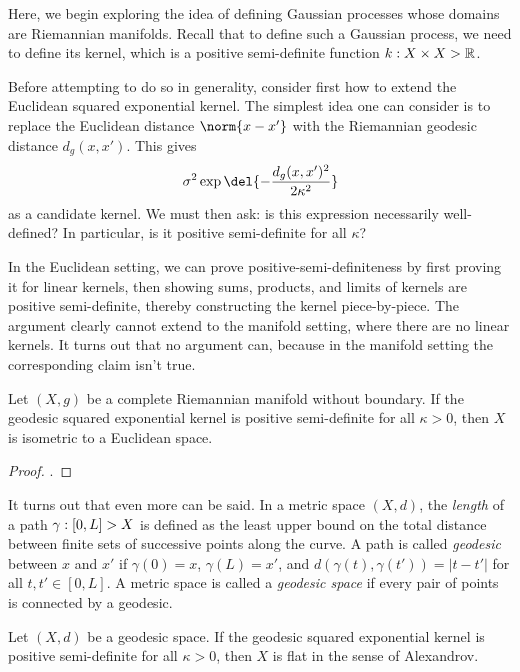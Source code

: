 \documentclass[11pt]{book}
\begin{document}
Here, we begin exploring the idea of defining Gaussian processes whose domains are Riemannian manifolds.
Recall that to define such a Gaussian process, we need to define its kernel, which is a positive semi-definite function $k : X \times X \-> \mathbb{R}$.

Before attempting to do so in generality, consider first how to extend the Euclidean squared exponential kernel.
The simplest idea one can consider is to replace the Euclidean distance $\norm{x-x'}$ with the Riemannian geodesic distance $d_g(x,x')$.
This gives 
\[
\sigma^2 \exp\del{-\frac{d_g(x,x')^2}{2\kappa^2}}
\]
as a candidate kernel.
We must then ask: is this expression necessarily well-defined? 
In particular, is it positive semi-definite for all $\kappa$?

In the Euclidean setting, we can prove positive-semi-definiteness by first proving it for linear kernels, then showing sums, products, and limits of kernels are positive semi-definite, thereby constructing the kernel piece-by-piece.
The argument clearly cannot extend to the manifold setting, where there are no linear kernels.
It turns out that no argument can, because in the manifold setting the corresponding claim isn't true.

\begin{result}
Let $(X,g)$ be a complete Riemannian manifold without boundary.
If the geodesic squared exponential kernel is positive semi-definite for all $\kappa > 0$, then $X$ is isometric to a Euclidean space.
\end{result}

\begin{proof}
\textcite[Theorem 2]{feragen15}.
\end{proof}

It turns out that even more can be said.
In a metric space $(X,d)$, the \emph{length} of a path  $\gamma : [0,L] \-> X$ is defined as the least upper bound on the total distance between finite sets of successive points along the curve.
A path is called \emph{geodesic} between $x$ and $x'$ if $\gamma(0) = x$, $\gamma(L) = x'$, and $d(\gamma(t),\gamma(t')) = |t - t'|$ for all $t,t'\in[0,L]$.
A metric space is called a \emph{geodesic space} if every pair of points is connected by a geodesic.

\begin{result}
Let $(X,d)$ be a geodesic space.
If the geodesic squared exponential kernel is positive semi-definite for all $\kappa > 0$, then $X$ is flat in the sense of Alexandrov.
\end{result}
\end{document}
